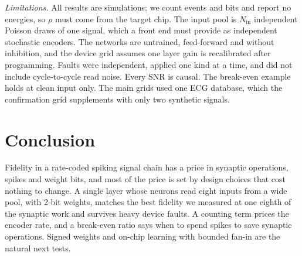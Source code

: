 \documentclass[conference]{IEEEtran}
\newcommand{\Nin}{N_\mathrm{in}}
\begin{document}
\emph{Limitations.} All results are simulations; we count events and bits and
report no energies, so $\rho$ must come from the target chip. The input pool is
$\Nin$ independent Poisson draws of one signal, which a front end must provide
as independent stochastic encoders. The networks are untrained, feed-forward
and without inhibition, and the device grid assumes one layer gain is
recalibrated after programming. Faults were independent, applied one kind at
a time, and did not include cycle-to-cycle read noise. Every SNR is causal. The
break-even example holds at clean input only. The main grids used one ECG
database, which the confirmation grid supplements with only two synthetic
signals.

\section{Conclusion}

Fidelity in a rate-coded spiking signal chain has a price in synaptic
operations, spikes and weight bits, and most of the price is set by design
choices that cost nothing to change. A single layer whose neurons read eight
inputs from a wide pool, with 2-bit weights, matches the best fidelity we
measured at one eighth of the synaptic work and survives heavy device faults.
A counting term prices the encoder rate, and a break-even ratio says when to
spend spikes to save synaptic operations. Signed weights and on-chip learning
with bounded fan-in are the natural next tests.



\end{document}
